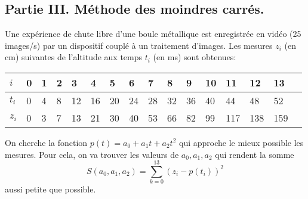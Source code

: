 \subsection*{Partie III. Méthode des moindres carrés.}
Une expérience de chute libre d'une boule métallique est enregistrée en vidéo (25 images/s) par un dispositif couplé à un traitement d'images. Les mesures $z_i$ (en cm) suivantes de l'altitude aux temps $t_i$ (en ms) sont obtenues:
\begin{center}\renewcommand{\arraystretch}{1.1}
\begin{tabular}{|l|l|l|l|l|l|l|l|l|l|l|l|l|l|l|l|}
\hline
$i$ &0 &1 & 2 & 3 & 4 & 5 & 6 & 7 & 8 & 9 & 10 & 11 & 12 & 13 \\ \hline
$t_i$ & 0 & 4 & 8 & 12 & 16 & 20 & 24 & 28 & 32 & 36 & 40 & 44 & 48 & 52\\ \hline
$z_i$ & 0 & 3 & 7 & 13 & 21 & 30 & 40 & 53 & 66 & 82 & 99 & 117 & 138 & 159 \\ \hline
\end{tabular}
\end{center}
On cherche la fonction $p(t) = a_0 + a_1t + a_2 t^2$ qui approche le mieux possible les mesures. Pour cela, on va trouver les valeurs de $a_0, a_1, a_2$ qui rendent la somme
\begin{displaymath}
 S(a_0,a_1,a_2) = \sum_{k=0}^{13}\left( z_i - p(t_i)\right)^2
\end{displaymath}
aussi petite que possible.

